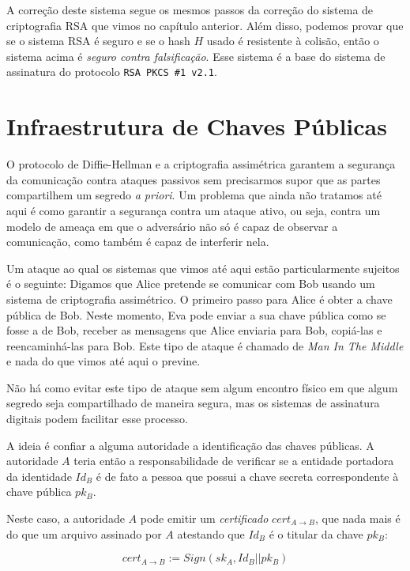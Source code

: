 A correção deste sistema segue os mesmos passos da correção do sistema de criptografia RSA que vimos no capítulo anterior.
Além disso, podemos provar que se o sistema RSA é seguro e se o hash $H$ usado é resistente à colisão, então o sistema acima é {\em seguro contra falsificação}.
Esse sistema é a base do sistema de assinatura do protocolo \texttt{RSA PKCS \#1 v2.1}.

\section{Infraestrutura de Chaves Públicas}
\label{sec:pki}

O protocolo de Diffie-Hellman e a criptografia assimétrica garantem a segurança da comunicação contra ataques passivos sem precisarmos supor que as partes compartilhem um segredo {\em a priori}.
Um problema que ainda não tratamos até aqui é como garantir a segurança contra um ataque ativo, ou seja, contra um modelo de ameaça em que o adversário não só é capaz de observar a comunicação, como também é capaz de interferir nela.

Um ataque ao qual os sistemas que vimos até aqui estão particularmente sujeitos é o seguinte:
Digamos que Alice pretende se comunicar com Bob usando um sistema de criptografia assimétrico.
O primeiro passo para Alice é obter a chave pública de Bob.
Neste momento, Eva pode enviar a sua chave pública como se fosse a de Bob, receber as mensagens que Alice enviaria para Bob, copiá-las e reencaminhá-las para Bob.
Este tipo de ataque é chamado de {\em Man In The Middle} e nada do que vimos até aqui o previne.

Não há como evitar este tipo de ataque sem algum encontro físico em que algum segredo seja compartilhado de maneira segura, mas os sistemas de assinatura digitais podem facilitar esse processo.

A ideia é confiar a alguma autoridade a identificação das chaves públicas.
A autoridade $A$ teria então a responsabilidade de verificar se a entidade portadora da identidade $Id_B$ é de fato a pessoa que possui a chave secreta correspondente à chave pública $pk_B$.

Neste caso, a autoridade $A$ pode emitir um {\em certificado} $cert_{A \to B}$, que nada mais é do que um arquivo assinado por $A$ atestando que \(Id_B\) é o titular da chave $pk_B$:

\begin{displaymath}
  cert_{A \to B} := Sign(sk_A, Id_B || pk_B)
\end{displaymath}


